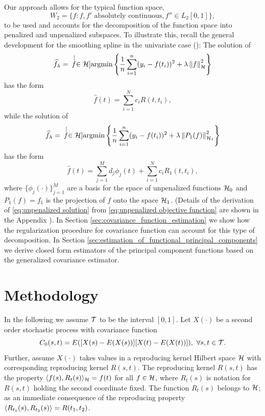 Our approach allows for the typical function space, 
\begin{equation}
	W_2 = \{f : f, f' \mbox{ absolutely continuous}, f'' \in L_2[0,1]\},
\end{equation} 
to be used and accounts for the decomposition of the function space into penalized and unpenalized subspaces. To illustrate this, recall the general development for the smoothing spline in the univariate case (\cite{Wahba:1990}): The solution of 
\begin{equation}
	\widehat{f}_{\lambda} = \hspace{.07in}\stackrel[f \in \mathcal{H}]{}{\mbox{argmin}} \left\{ \frac{1}{n}\sum_{i=1}^{n}(y_i - f(t_i))^2 + \lambda\left\|f\right\|^2_{\mathcal{H}} \right\} 
\end{equation}
has the form 
\begin{equation}
	\hat{f}(t) = \sum_{i=1}^N c_iR(t, t_i), 
\end{equation}
while the solution of 
\begin{equation}
	\widehat{f}_{\lambda} = \hspace{.07in}\stackrel[f \in \mathcal{H}]{}{\mbox{argmin}} \left\{ \frac{1}{n}\sum_{i=1}^{n}(y_i - f(t_i))^2 + \lambda\left\|P_1(f)\right\|^2_{\mathcal{H}_1} \right\} \label{eq:unpenalized objective function} 
\end{equation}
has the form 
\begin{equation}
	\hat{f}(t) = \sum_{j=1}^M d_j\phi_j(t) + \sum_{i=1}^N c_iR_1(t, t_i), \label{eq:unpenalized solution} 
\end{equation}
where $\{\phi_j(\cdot)\}_{j=1}^M$ are a basis for the space of unpenalized functions $\mathcal{H}_0$ and $P_1(f)=f_1$ is the projection of $f$ onto the space $\mathcal{H}_1$. (Details of the derivation of \eqref{eq:unpenalized solution} from \eqref{eq:unpenalized objective function} are shown in the Appendix ). In Section \ref{sec:covariance_function_estimation} we show how the regularization procedure for covariance function can account for this type of decomposition. In Section \ref{sec:estimation_of_functional_principal_components} we derive closed form estimators of the principal component functions based on the generalized covariance estimator.

\section{Methodology} 

\label{sec:methodology}

In the following we assume $\mathcal{T}$ to be the interval $[0,1]$. Let $X(\cdot)$ be a second order stochastic process with covariance function
\[ C_{0}(s,t)=E([X(s)-E(X(s))][X(t)-E(X(t))]),\mbox{ }\forall s,t\in \mathcal{T}. \]
Further, assume $X(\cdot)$ takes values in a reproducing kernel Hilbert space $\mathcal{H}$ with corresponding reproducing kernel $R(s,t)$. The reproducing kernel $R(s,t)$ has the property $\langle f(s), R_t(s) \rangle_{\mathcal{H}} = f(t)$ for all $f \in \mathcal{H}$, where $R_t(s)$ is notation for $R(s,t)$ holding the second coordinate fixed. The function $R_t(s)$ belongs to $\mathcal{H}$; as an immediate consequence of the reproducing property $\langle R_{t_1}(s), R_{t_2}(s) \rangle = R(t_1, t_2)$. 

